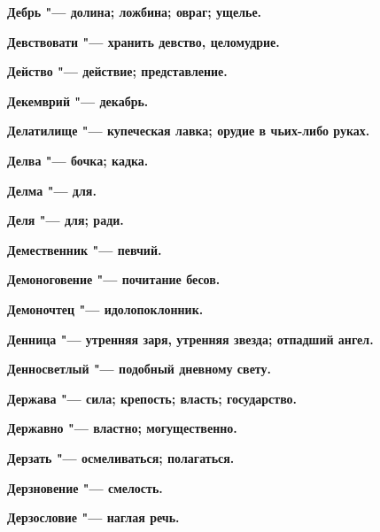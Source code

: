 \bfseries Дебрь \normalfont{} "--- долина; ложбина; овраг; ущелье. 




\bfseries Девствовати \normalfont{} "--- хранить девство, целомудрие. 




\bfseries Действо \normalfont{} "--- действие; представление. 




\bfseries Декемврий \normalfont{} "--- декабрь. 




\bfseries Делатилище \normalfont{} "--- купеческая лавка; орудие в чьих-либо руках. 




\bfseries Делва \normalfont{} "--- бочка; кадка. 




\bfseries Делма \normalfont{} "--- для. 




\bfseries Деля \normalfont{} "--- для; ради. 




\bfseries Демественник \normalfont{} "--- певчий. 




\bfseries Демоноговение \normalfont{} "--- почитание бесов. 




\bfseries Демоночтец \normalfont{} "--- идолопоклонник. 




\bfseries Денница \normalfont{} "--- утренняя заря, утренняя звезда; отпадший ангел. 




\bfseries Денносветлый \normalfont{} "--- подобный дневному свету. 




\bfseries Держава \normalfont{} "--- сила; крепость; власть; государство. 




\bfseries Державно \normalfont{} "--- властно; могущественно. 




\bfseries Дерзать \normalfont{} "--- осмеливаться; полагаться. 




\bfseries Дерзновение \normalfont{} "--- смелость. 




\bfseries Дерзословие \normalfont{} "--- наглая речь. 




